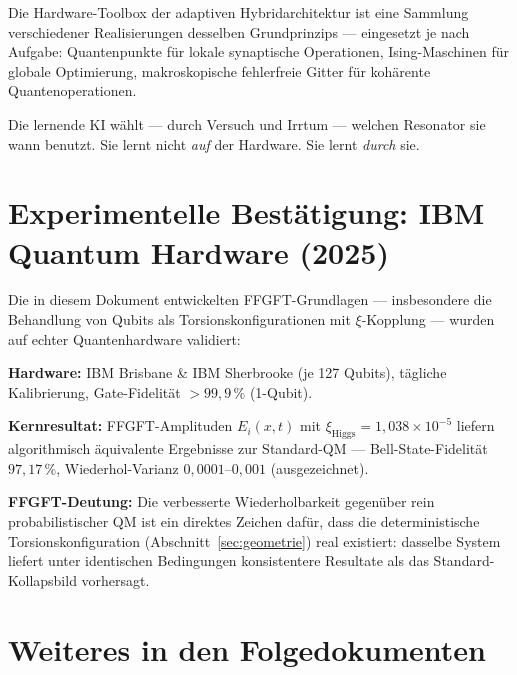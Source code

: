 \begin{significance}
Die Hardware-Toolbox der adaptiven Hybridarchitektur
ist eine Sammlung verschiedener Realisierungen desselben
Grundprinzips --- eingesetzt je nach Aufgabe:
Quantenpunkte für lokale synaptische Operationen,
Ising-Maschinen für globale Optimierung,
makroskopische fehlerfreie Gitter für kohärente Quantenoperationen.

Die lernende KI wählt --- durch Versuch und Irrtum ---
welchen Resonator sie wann benutzt.
Sie lernt nicht \textit{auf} der Hardware.
Sie lernt \textit{durch} sie.
\end{significance}

\section{Experimentelle Bestätigung: IBM Quantum Hardware (2025)}
\label{sec:ibm-validation}

\begin{keyresult}
Die in diesem Dokument entwickelten FFGFT-Grundlagen ---
insbesondere die Behandlung von Qubits als Torsionskonfigurationen
mit $\xi$-Kopplung --- wurden auf echter Quantenhardware validiert:

\textbf{Hardware:} IBM Brisbane \& IBM Sherbrooke (je 127 Qubits),
tägliche Kalibrierung, Gate-Fidelität $> 99{,}9\,\%$ (1-Qubit).

\textbf{Kernresultat:}
FFGFT-Amplituden $E_i(x,t)$ mit $\xi_\text{Higgs} = 1{,}038 \times 10^{-5}$
liefern algorithmisch äquivalente Ergebnisse zur Standard-QM ---
Bell-State-Fidelität $97{,}17\,\%$, Wiederhol-Varianz
$0{,}0001$--$0{,}001$ (ausgezeichnet).

\textbf{FFGFT-Deutung:}
Die verbesserte Wiederholbarkeit gegenüber rein probabilistischer QM
ist ein direktes Zeichen dafür, dass die deterministische
Torsionskonfiguration (Abschnitt~\ref{sec:geometrie}) real existiert:
dasselbe System liefert unter identischen Bedingungen
konsistentere Resultate als das Standard-Kollapsbild vorhersagt.
\end{keyresult}

\section{Weiteres in den Folgedokumenten}
\label{sec:folgedokumente}

